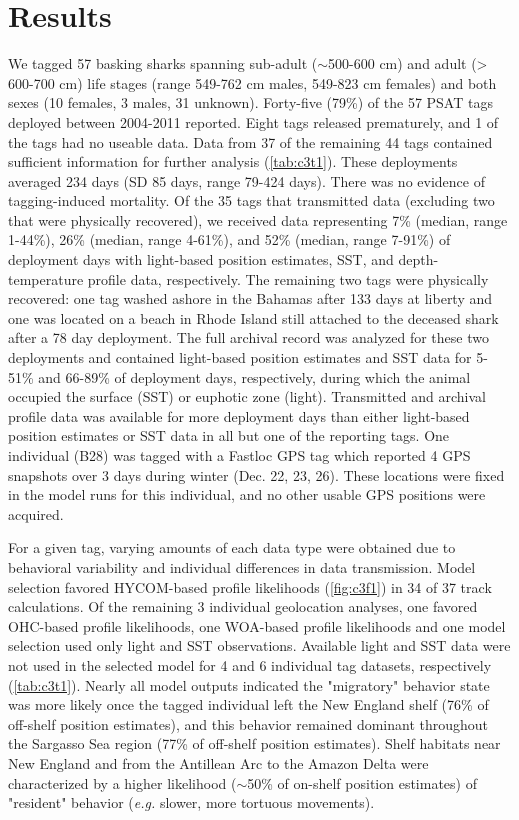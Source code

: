 \section{Results}
We tagged 57 basking sharks spanning sub-adult ($\sim$500-600 cm) and adult (> 600-700 cm) life stages (range 549-762 cm males, 549-823 cm females) and both sexes (10 females, 3 males, 31 unknown). Forty-five (79\%) of the 57 PSAT tags deployed between 2004-2011 reported. Eight tags released prematurely, and 1 of the tags had no useable data. Data from 37 of the remaining 44 tags contained sufficient information for further analysis (\cref{tab:c3t1}). These deployments averaged 234 days (SD 85 days, range 79-424 days). There was no evidence of tagging-induced mortality. Of the 35 tags that transmitted data (excluding two that were physically recovered), we received data representing 7\% (median, range 1-44\%), 26\% (median, range 4-61\%), and 52\% (median, range 7-91\%) of deployment days with light-based position estimates, SST, and depth-temperature profile data, respectively. The remaining two tags were physically recovered: one tag washed ashore in the Bahamas after 133 days at liberty and one was located on a beach in Rhode Island still attached to the deceased shark after a 78 day deployment. The full archival record was analyzed for these two deployments and contained light-based position estimates and SST data for 5-51\% and 66-89\% of deployment days, respectively, during which the animal occupied the surface (SST) or euphotic zone (light). Transmitted and archival profile data was available for more deployment days than either light-based position estimates or SST data in all but one of the reporting tags. One individual (B28) was tagged with a Fastloc GPS tag which reported 4 GPS snapshots over 3 days during winter (Dec. 22, 23, 26). These locations were fixed in the model runs for this individual, and no other usable GPS positions were acquired.

For a given tag, varying amounts of each data type were obtained due to behavioral variability and individual differences in data transmission.  Model selection favored HYCOM-based profile likelihoods (\cref{fig:c3f1}) in 34 of 37 track calculations. Of the remaining 3 individual geolocation analyses, one favored OHC-based profile likelihoods, one WOA-based profile likelihoods and one model selection used only light and SST observations. Available light and SST data were not used in the selected model for 4 and 6 individual tag datasets, respectively (\cref{tab:c3t1}). Nearly all model outputs indicated the "migratory" behavior state was more likely once the tagged individual left the New England shelf (76\% of off-shelf position estimates), and this behavior remained dominant throughout the Sargasso Sea region (77\% of off-shelf position estimates). Shelf habitats near New England and from the Antillean Arc to the Amazon Delta were characterized by a higher likelihood ($\sim$50\% of on-shelf position estimates) of "resident" behavior (\emph{e.g.} slower, more tortuous movements).

